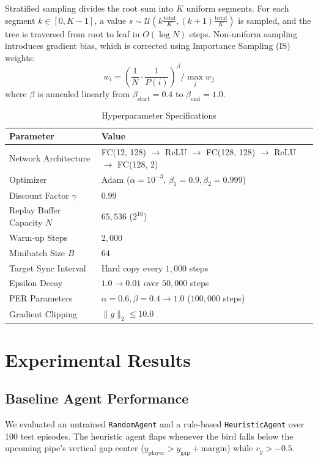\documentclass[12pt,a4paper]{article}
\begin{document}
Stratified sampling divides the root sum into $K$ uniform segments. For each segment $k \in [0, K-1]$, a value $s \sim \mathcal{U}\left(k \frac{\text{total}}{K}, (k+1) \frac{\text{total}}{K}\right)$ is sampled, and the tree is traversed from root to leaf in $O(\log N)$ steps. Non-uniform sampling introduces gradient bias, which is corrected using Importance Sampling (IS) weights:
\begin{equation}
w_i = \left( \frac{1}{N} \cdot \frac{1}{P(i)} \right)^\beta \Big/ \max_j w_j
\end{equation}
where $\beta$ is annealed linearly from $\beta_{\text{start}} = 0.4$ to $\beta_{\text{end}} = 1.0$.

\begin{table}[h]
\centering
\caption{Hyperparameter Specifications}
\label{tab:hypers}
\small
\begin{tabular}{ll}
\toprule
\textbf{Parameter} & \textbf{Value} \\
\midrule
Network Architecture & FC(12, 128) $\to$ ReLU $\to$ FC(128, 128) $\to$ ReLU $\to$ FC(128, 2) \\
Optimizer & Adam ($\alpha = 10^{-3}$, $\beta_1=0.9, \beta_2=0.999$) \\
Discount Factor $\gamma$ & $0.99$ \\
Replay Buffer Capacity $N$ & $65,536$ ($2^{16}$) \\
Warm-up Steps & $2,000$ \\
Minibatch Size $B$ & $64$ \\
Target Sync Interval & Hard copy every $1,000$ steps \\
Epsilon Decay & $1.0 \to 0.01$ over $50,000$ steps \\
PER Parameters & $\alpha = 0.6, \beta = 0.4 \to 1.0$ ($100,000$ steps) \\
Gradient Clipping & $\|g\|_2 \le 10.0$ \\
\bottomrule
\end{tabular}
\end{table}

\section{Experimental Results}
\subsection{Baseline Agent Performance}
We evaluated an untrained \texttt{RandomAgent} and a rule-based \texttt{HeuristicAgent} over 100 test episodes. The heuristic agent flaps whenever the bird falls below the upcoming pipe's vertical gap center ($y_{\text{player}} > y_{\text{gap}} + \text{margin}$) while $v_y > -0.5$.
\end{document}
